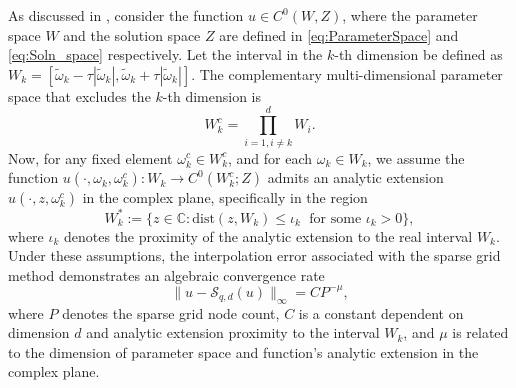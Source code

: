 \documentclass[final,3p,times,11pt]{elsarticle}
\begin{document}


As discussed in \cite{NoTeWe:2008,TeJaWe:2015}, consider the function $u \in C^0(W,Z)$, where the parameter space $W$ and the solution space $Z$ are defined in \eqref{eq:ParameterSpace} and \eqref{eq:Soln_space} respectively. Let the interval in the $k$-th dimension be defined as $W_k = \left[\widetilde{\omega}_k-\tau \left\vert \widetilde{\omega}_k\right\vert, \widetilde{\omega}_k+\tau \left\vert \widetilde{\omega}_k\right\vert\right]$. The complementary multi-dimensional parameter space that excludes the $k$-th dimension is 
%
\[
W_k^c = \prod_{i=1, i\neq k}^d W_i.
\]
%
Now, for any fixed element $\omega_k^c \in W_k^c$, and for each $\omega_k\in W_k$, we assume the function $u(\cdot,\omega_k,\omega_k^c): W_k \rightarrow C^0(W_k^c;Z)$ admits an analytic extension  $u(\cdot, z,\omega_k^c)$ in the complex plane, specifically in the region 
%
\[
W_k^{*}:=\{z\in \mathbb{C}: \text{dist} (z,W_k)\le \iota_k \;\text{ for some } \iota_k>0\},
\]
%
where $\iota_k$ denotes the proximity of the analytic extension to the real interval $W_k$. Under these assumptions, the interpolation error associated with the sparse grid method demonstrates an algebraic convergence rate
%
\begin{equation} \label{eq:coll-error-bound_2}
  \big\|u-\mathcal{S}_{q, d} (u)\big\|_\infty = C P^{-\mu},
\end{equation}
%
where $P$ denotes the sparse grid node count, $C$ is a constant dependent on dimension $d$ and analytic extension proximity to the interval $W_k$, and $\displaystyle \mu$ is related to the dimension of parameter space and function's analytic extension in the complex plane.

\end{document}
